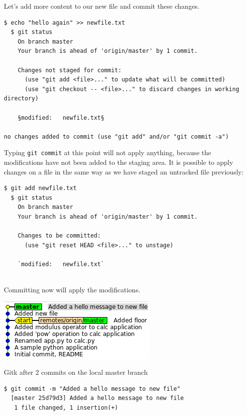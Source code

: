\documentclass[a4paper]{../../common/tufte-latex/tufte-handout}
\begin{document}
Let's add more content to our new file and commit these changes.

\begin{lstlisting}[style=BashInputStyle]
  $ echo "hello again" >> newfile.txt
  $ git status
    On branch master
    Your branch is ahead of 'origin/master' by 1 commit.
  
    Changes not staged for commit:
      (use "git add <file>..." to update what will be committed)
      (use "git checkout -- <file>..." to discard changes in working directory)
   
    §modified:   newfile.txt§
   
no changes added to commit (use "git add" and/or "git commit -a")
\end{lstlisting}

Typing \texttt{git commit} at this point will not apply anything, because the modifications have not been added to the staging area.
It is possible to apply changes on a file in the same way as we have staged an untracked file previously:

\begin{lstlisting}[style=BashInputStyle]
  $ git add newfile.txt
  $ git status
    On branch master
    Your branch is ahead of 'origin/master' by 1 commit.
  
    Changes to be committed:
      (use "git reset HEAD <file>..." to unstage)
  
    `modified:   newfile.txt`
 
\end{lstlisting}

Committing now will apply the modifications.

\begin{marginfigure}%
  \centering
  \includegraphics[width=\linewidth]{gitk-2commits.png}
  \label{fig:gitk2commits}
  \caption{Gitk after 2 commits on the local master branch}
\end{marginfigure}

\begin{lstlisting}[style=BashInputStyle]
  $ git commit -m "Added a hello message to new file"
  [master 25d79d3] Added a hello message to new file
   1 file changed, 1 insertion(+)
\end{lstlisting}
\end{document}
